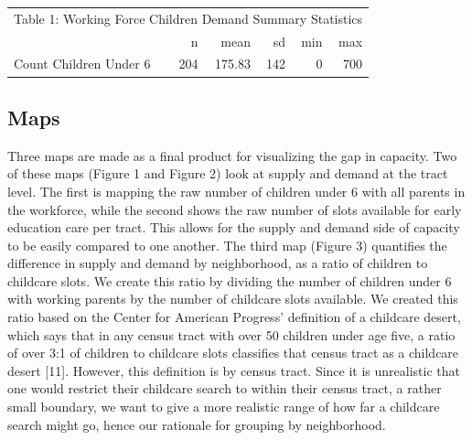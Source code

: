 \documentclass[10pt,letterpaper]{article}
\begin{document}
\begin{table}[!h]
\centering\begingroup\fontsize{10}{12}\selectfont

\begin{tabular}{l|r|r|r|r|r}
\hline
\multicolumn{6}{c|}{Table 1: Working Force Children Demand Summary Statistics} \\
\cline{1-6}
  & n & mean & sd & min & max\\
\hline
\rowcolor{gray!6}  Count Children Under 6 & 204 & 175.83 & 142 & 0 & 700\\
\hline
\end{tabular}
\endgroup{}
\end{table}

\subsection{Maps}\label{maps}

Three maps are made as a final product for visualizing the gap in
capacity. Two of these maps (Figure 1 and Figure 2) look at supply and
demand at the tract level. The first is mapping the raw number of
children under 6 with all parents in the workforce, while the second
shows the raw number of slots available for early education care per
tract. This allows for the supply and demand side of capacity to be
easily compared to one another. The third map (Figure 3) quantifies the
difference in supply and demand by neighborhood, as a ratio of children
to childcare slots. We create this ratio by dividing the number of
children under 6 with working parents by the number of childcare slots
available. We created this ratio based on the Center for American
Progress' definition of a childcare desert, which says that in any
census tract with over 50 children under age five, a ratio of over 3:1
of children to childcare slots classifies that census tract as a
childcare desert {[}11{]}. However, this definition is by census tract.
Since it is unrealistic that one would restrict their childcare search
to within their census tract, a rather small boundary, we want to give a
more realistic range of how far a childcare search might go, hence our
rationale for grouping by neighborhood.
\end{document}
